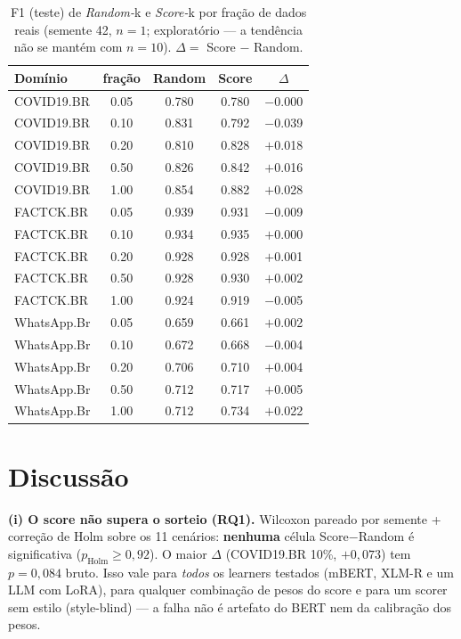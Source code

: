 \documentclass[conference]{IEEEtran}
\begin{document}
\begin{table}[!t]
\caption{F1 (teste) de \emph{Random-}k e \emph{Score-}k por fra\c{c}\~ao de dados reais (semente 42, $n{=}1$; explorat\'orio --- a tend\^encia n\~ao se mant\'em com $n{=}10$). $\Delta = $ Score $-$ Random.}\label{tab:competence}
\centering
\footnotesize
\setlength{\tabcolsep}{4pt}
\begin{tabular}{@{}lcccc@{}}
\toprule
Dom\'inio & fra\c{c}\~ao & Random & Score & $\Delta$ \\
\midrule
COVID19.BR & 0.05 & 0.780 & 0.780 & $-$0.000 \\
COVID19.BR & 0.10 & 0.831 & 0.792 & $-$0.039 \\
COVID19.BR & 0.20 & 0.810 & 0.828 & $+$0.018 \\
COVID19.BR & 0.50 & 0.826 & 0.842 & $+$0.016 \\
COVID19.BR & 1.00 & 0.854 & 0.882 & $+$0.028 \\
FACTCK.BR & 0.05 & 0.939 & 0.931 & $-$0.009 \\
FACTCK.BR & 0.10 & 0.934 & 0.935 & $+$0.000 \\
FACTCK.BR & 0.20 & 0.928 & 0.928 & $+$0.001 \\
FACTCK.BR & 0.50 & 0.928 & 0.930 & $+$0.002 \\
FACTCK.BR & 1.00 & 0.924 & 0.919 & $-$0.005 \\
WhatsApp.Br & 0.05 & 0.659 & 0.661 & $+$0.002 \\
WhatsApp.Br & 0.10 & 0.672 & 0.668 & $-$0.004 \\
WhatsApp.Br & 0.20 & 0.706 & 0.710 & $+$0.004 \\
WhatsApp.Br & 0.50 & 0.712 & 0.717 & $+$0.005 \\
WhatsApp.Br & 1.00 & 0.712 & 0.734 & $+$0.022 \\
\bottomrule
\end{tabular}
\end{table}

\section{Discuss\~ao}

\textbf{(i) O score n\~ao supera o sorteio (RQ1).} Wilcoxon pareado por semente + corre\c{c}\~ao de Holm sobre os 11 cen\'arios: \textbf{nenhuma} c\'elula Score$-$Random \'e significativa ($p_{\mathrm{Holm}}\ge 0{,}92$). O maior $\Delta$ (COVID19.BR 10\%, $+0{,}073$) tem $p{=}0{,}084$ bruto. Isso vale para \emph{todos} os learners testados (mBERT, XLM-R e um LLM com LoRA), para qualquer combina\c{c}\~ao de pesos do score e para um scorer sem estilo (style-blind) --- a falha n\~ao \'e artefato do BERT nem da calibra\c{c}\~ao dos pesos.
\end{document}
